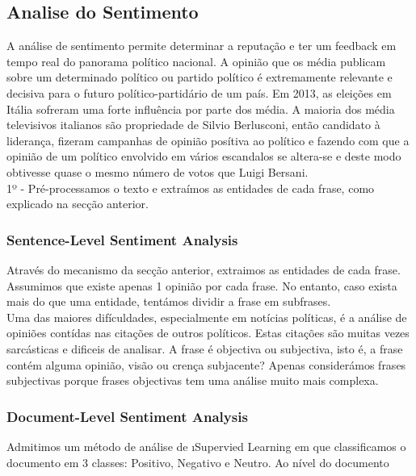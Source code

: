 \subsection{Analise do Sentimento}
\label{sec:sentiment_analysis}
A análise de sentimento permite determinar a reputação e ter um feedback em tempo real do panorama político nacional. A opinião que os média publicam sobre um determinado político ou partido político é extremamente relevante e decisiva para o futuro político-partidário de um país. Em 2013, as eleições em Itália sofreram uma forte influência por parte dos média. A maioria dos média televisivos italianos são propriedade de Silvio Berlusconi, então candidato à liderança, fizeram campanhas de opinião posítiva ao político e fazendo com que a opinião de um político envolvido em vários escandalos se altera-se e deste modo obtivesse quase o mesmo número de votos que Luigi Bersani.\\

1º - Pré-processamos o texto e extraímos as entidades de cada frase, como explicado na secção anterior. 


\subsubsection{Sentence-Level Sentiment Analysis}
Através do mecanismo da secção anterior, extraimos as entidades de cada frase. Assumimos que existe apenas 1 opinião por cada frase. No entanto, caso exista mais do que uma entidade, tentámos dividir a frase em subfrases. \\
Uma das maiores difículdades, especialmente em notícias políticas, é a análise de opiniões contídas nas citações de outros políticos. Estas citações são muitas vezes sarcásticas e dificeis de analisar. 
A frase é objectiva ou subjectiva, isto é, a frase contém alguma opinião, visão ou crença subjacente? Apenas considerámos frases subjectivas porque frases objectivas tem uma análise muito mais complexa. 

\subsubsection{Document-Level Sentiment Analysis}
Admitimos um método de análise de \i{Supervied Learning} em que classificamos o documento em 3 classes: Positivo, Negativo e Neutro. 
Ao nível do documento


